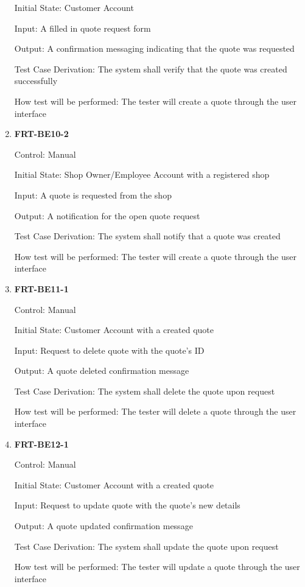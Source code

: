 \documentclass[12pt, titlepage]{article}
\begin{document}
\begin{enumerate}
	      Initial State: Customer Account

	      Input: A filled in quote request form

	      Output: A confirmation messaging indicating that the quote was requested

	      Test Case Derivation: The system shall verify that the quote was created successfully

	      How test will be performed: The tester will create a quote through the user interface

	\item \textbf{FRT-BE10-2}

	      Control: Manual

	      Initial State: Shop Owner/Employee Account with a registered shop

	      Input: A quote is requested from the shop

	      Output: A notification for the open quote request

	      Test Case Derivation: The system shall notify that a quote was created

	      How test will be performed: The tester will create a quote through the user interface

	\item \textbf{FRT-BE11-1}

	      Control: Manual

	      Initial State: Customer Account with a created quote

	      Input: Request to delete quote with the quote's ID

	      Output: A quote deleted confirmation message

	      Test Case Derivation: The system shall delete the quote upon request

	      How test will be performed: The tester will delete a quote through the user interface

	\item \textbf{FRT-BE12-1}

	      Control: Manual

	      Initial State: Customer Account with a created quote

	      Input: Request to update quote with the quote's new details

	      Output: A quote updated confirmation message

	      Test Case Derivation: The system shall update the quote upon request

	      How test will be performed: The tester will update a quote through the user interface


\end{enumerate}
\end{document}
